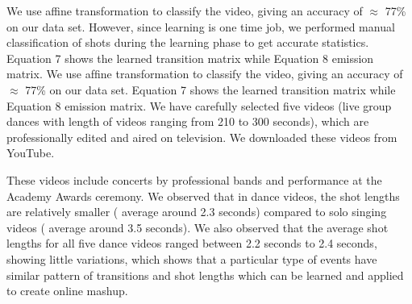 \documentclass{sig-alternate}
\begin{document}
We use affine transformation to classify the video, giving an accuracy of \(\approx\) 77\% on our data set. However, since learning is one time job, we performed manual classiﬁcation of shots during the learning phase to get accurate statistics. Equation 7 shows the learned transition matrix while Equation 8 emission matrix.  We use afﬁne transformation to classify the video, giving an accuracy of \(\approx\) 77\% on our data set.  Equation 7 shows the learned transition matrix while Equation 8 emission matrix. We have carefully selected five videos (live group dances with length of videos ranging from 210 to 300 seconds), which are professionally edited and aired on television. We downloaded these videos from YouTube. 

These videos include concerts by professional bands and performance at the Academy Awards ceremony. We observed that in dance videos, the shot lengths are relatively smaller ( average around 2.3 seconds) compared to solo singing videos ( average around 3.5 seconds).  We also observed that the average shot lengths for all ﬁve dance videos ranged between 2.2 seconds to 2.4 seconds, showing little variations, which shows that a particular type of events have similar pattern of transitions and shot lengths which can be learned and applied to create online mashup.
\end{document}
